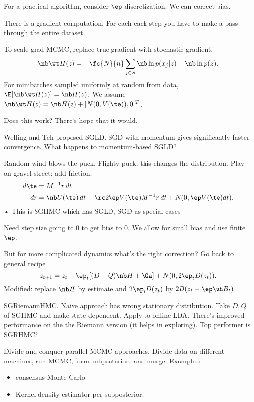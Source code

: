 For a practical algorithm, consider $\ep$-discretization. We can correct bias.

There is a gradient computation. For each each step you have to make a pass through the entire dataset.

To scale grad-MCMC, replace true gradient with stochastic gradient.
$$
\nb \wt H(z) = -\fc{N}{n} \sum_{j\in S} \nb \ln p(x_j|z) - \nb \ln p(z).
$$
For minibatches sampled uniformly at random from data,  $\E[\nb \wt H(z)] = \nb H(z)$. We assume $\nb \wt H(z) = \nb H(z) + [N(0,V(\te)),0]^T$.

Does this work? There's hope that it would.

Welling and Teh proposed SGLD. SGD with momentum gives significantly faster convergence. What happens to momentum-based SGLD?

Random wind blows the puck. Flighty puck: this changes the distribution. Play on gravel street: add friction.
\begin{align}
d\te &= M^{-1}r\,dt\\
dr &= \nb U(\te) \,dt - \rc2 \ep V(\te)M^{-1}r\,dt + N(0,\ep V(\te)dt). 
\end{align}•
This is SGHMC which has SGLD, SGD as special cases.

Need step size going to 0 to get bias to 0. We allow for small bias and use finite $\ep$. 


But for more complicated dynamics what's the right correction?
Go back to general recipe
$$
z_{t+1}=z_t-\ep_t[(D+Q)\nb H + \Ga] + N(0,2\ep_t D(z_t)).
$$
Modified: replace $\nb H$ by estimate and $2\ep_t D(z_t)$ by $2D(z_t-\ep \wh B_t)$.

SGRiemannHMC.  Naive approach has wrong stationary distribution. 
Take $D,Q$ of SGHMC and make state dependent.
Apply to online LDA. There's improved performance on the the Riemann version (it helps in exploring). Top performer is SGRHMC?


Divide and conquer parallel MCMC approaches. Divide data on different machines, run MCMC, form subposteriors and merge. 
Examples:
\begin{itemize}
\item
consensus Monte Carlo
\item
Kernel density estimator per subposterior.
\end{itemize}

